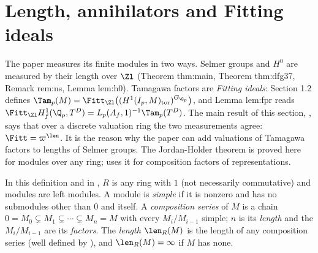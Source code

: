 \section{Length, annihilators and Fitting ideals}\label{sec:modules:length}

The paper measures its finite modules in two ways. Selmer groups and $H^0$ are measured by their length over $\Zl$
(Theorem thm:main, Theorem thm:dfg37, Remark rem:ns, Lemma lem:h0). Tamagawa factors are \emph{Fitting ideals}: Section 1.2 defines
$\Tam_p(M)=\Fitt_{\Zl}\bigl((H^1(I_p,M)_{\mathrm{tor}})^{G_{\Q_p}}\bigr)$, and Lemma lem:fpr reads $\Fitt_{\Zl}H^1_f(\Q_p,T^D)=L_p(A_f,1)^{-1}\Tam_p(T^D)$. The main
result of this section, , says that over a discrete valuation ring the two measurements agree:
$\Fitt=\varpi^{\len}$. It is the reason why the paper can add valuations of Tamagawa factors to lengths of Selmer groups. The
Jordan-Holder theorem is proved here for modules over any ring;  uses it for composition factors of representations.

\begin{definition}\label{def:modules:composition}
In this definition and in , $R$ is any ring with $1$ (not necessarily commutative) and modules are
left modules. A module is \emph{simple} if it is nonzero and has no submodules other than $0$ and itself. A \emph{composition series}
of $M$ is a chain $0=M_0\subsetneq M_1\subsetneq\cdots\subsetneq M_n=M$ with every $M_i/M_{i-1}$ simple; $n$ is its \emph{length} and the $M_i/M_{i-1}$ are its
\emph{factors}. The \emph{length} $\len_R(M)$ is the length of any composition series (well defined by ), and
$\len_R(M)=\infty$ if $M$ has none.
\end{definition}


